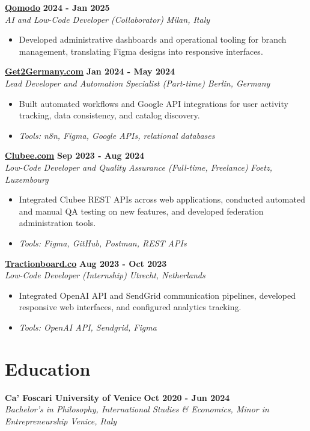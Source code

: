 \documentclass[a4paper,11pt]{article}
\newcommand{\role}[4]{%
 \textbf{#1} \hfill \textbf{#2}\\[1pt]%
 \textit{#3} \hfill \textit{#4}\\[2pt]%
}
\begin{document}
\role{\href{https://www.qomodo.me/}{Qomodo}}{2024 - Jan 2025}{AI and Low-Code Developer (Collaborator)}{Milan, Italy}
\begin{itemize}
 \item Developed administrative dashboards and operational tooling for branch management, translating Figma designs into responsive interfaces.
\end{itemize}

\role{\href{https://get2germany.com}{Get2Germany.com}}{Jan 2024 - May 2024}{Lead Developer and Automation Specialist (Part-time)}{Berlin, Germany}
\begin{itemize}
 \item Built automated workflows and Google API integrations for user activity tracking, data consistency, and catalog discovery.
 \item \textit{Tools: n8n, Figma, Google APIs, relational databases}
\end{itemize}

\role{\href{https://clubee.com}{Clubee.com}}{Sep 2023 - Aug 2024}{Low-Code Developer and Quality Assurance (Full-time, Freelance)}{Foetz, Luxembourg}
\begin{itemize}
 \item Integrated Clubee REST APIs across web applications, conducted automated and manual QA testing on new features, and developed federation administration tools.
 \item \textit{Tools: Figma, GitHub, Postman, REST APIs}
\end{itemize}

\role{\href{https://tractionboard.co}{Tractionboard.co}}{Aug 2023 - Oct 2023}{Low-Code Developer (Internship)}{Utrecht, Netherlands}
\begin{itemize}
 \item Integrated OpenAI API and SendGrid communication pipelines, developed responsive web interfaces, and configured analytics tracking.
 \item \textit{Tools: OpenAI API, Sendgrid, Figma}
\end{itemize}

\section{Education}
\role{Ca' Foscari University of Venice}{Oct 2020 - Jun 2024}{Bachelor's in Philosophy, International Studies \& Economics, Minor in Entrepreneurship}{Venice, Italy}
\end{document}
